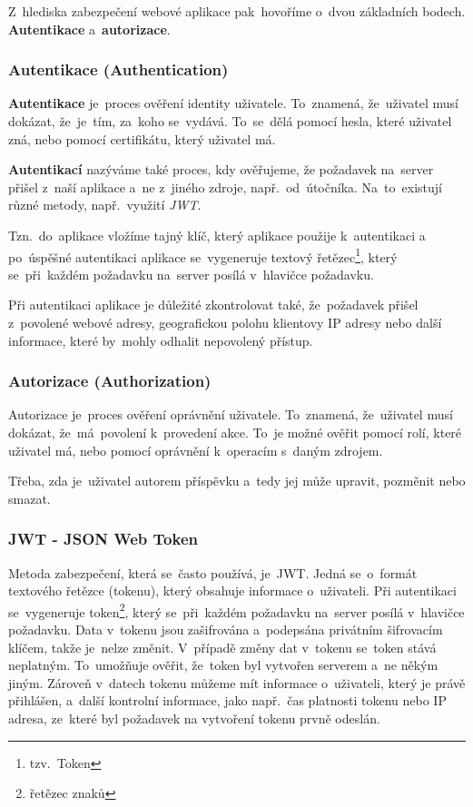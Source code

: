 \documentclass[14pt,a4paper]{article}
\begin{document}
        Z~hlediska zabezpečení webové aplikace pak~hovoříme o~dvou základních bodech. \textbf{Autentikace} a~\textbf{autorizace}.

            \subsubsection{Autentikace (Authentication)}
            \textbf{Autentikace} je~proces ověření identity uživatele. To~znamená, že~uživatel musí dokázat, že~je~tím, za~koho se~vydává.
            To~se~dělá pomocí hesla, které uživatel zná, nebo pomocí certifikátu, který uživatel má.

            \textbf{Autentikací} nazýváme také proces, kdy ověřujeme, že požadavek na~server přišel z~naší aplikace a~ne z~jiného zdroje,
            např.~od~útočníka. Na~to~existují různé metody, např.~využití \emph{JWT}.

            Tzn.~do~aplikace vložíme tajný klíč, který aplikace použije k~autentikaci a po~úspěšné autentikaci aplikace se~vygeneruje textový řetězec\footnote{tzv.~Token},
            který se~při~každém požadavku na~server posílá v~hlavičce požadavku.

            Při autentikaci aplikace je důležité zkontrolovat také, že~požadavek přišel z~povolené webové adresy, geografickou polohu klientovy IP adresy
            nebo další informace, které by~mohly odhalit nepovolený přístup. \parencite{graham2021ethical}

            \subsubsection{Autorizace (Authorization)}
            Autorizace je~proces ověření oprávnění uživatele. To~znamená, že~uživatel musí dokázat, že~má~povolení k~provedení akce.
            To~je možné ověřit pomocí rolí, které uživatel má, nebo pomocí oprávnění k~operacím s~daným zdrojem.

            Třeba, zda je~uživatel autorem příspěvku a~tedy jej může upravit, pozměnit nebo smazat.\parencite{graham2021ethical}

            \subsubsection{JWT - JSON Web Token}
            Metoda zabezpečení, která se~často používá, je~JWT. Jedná se~o~formát textového řetězce (tokenu), který obsahuje informace o~uživateli.
            Při autentikaci se~vygeneruje token\footnote{řetězec znaků}, který se~při~každém požadavku na~server posílá v~hlavičce požadavku.
            Data v~tokenu jsou zašifrována a~podepsána privátním šifrovacím klíčem, takže je~nelze změnit. V~případě změny dat v~tokenu se~token stává neplatným.
            To~umožňuje ověřit, že~token byl vytvořen serverem a~ne někým jiným. Zároveň v~datech tokenu můžeme mít informace o~uživateli, který je právě přihlášen,
            a~další kontrolní informace, jako např.~čas platnosti tokenu nebo IP adresa, ze~které byl požadavek na vytvoření tokenu prvně odeslán.
\end{document}

